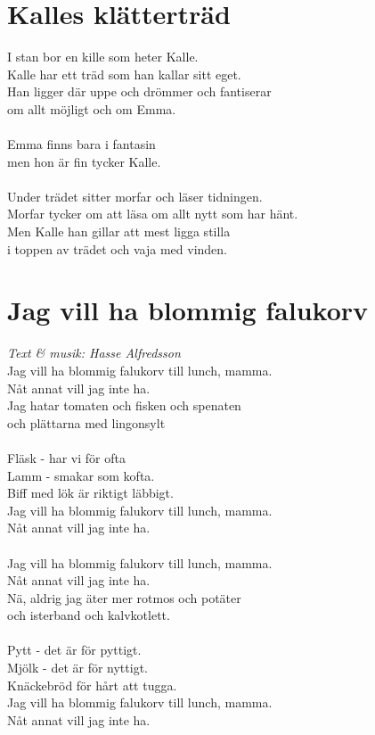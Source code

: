 \section{Kalles klätterträd}
I stan bor en kille som heter Kalle.\\
Kalle har ett träd som han kallar sitt eget.\\
Han ligger där uppe och drömmer och fantiserar\\
om allt möjligt och om Emma.\\
\\
Emma finns bara i fantasin \\
men hon är fin tycker Kalle.\\
\\
Under trädet sitter morfar och läser tidningen.\\
Morfar tycker om att läsa om allt nytt som har hänt.\\
Men Kalle han gillar att mest ligga stilla\\
i toppen av trädet och vaja med vinden.\\

\section{Jag vill ha blommig falukorv}
\textit{Text \& musik: Hasse Alfredsson}
\vspace{2mm}\\
Jag vill ha blommig falukorv till lunch, mamma.\\
Nåt annat vill jag inte ha.\\
Jag hatar tomaten och fisken och spenaten\\
och plättarna med lingonsylt\\
\\
Fläsk - har vi för ofta\\
Lamm - smakar som kofta.\\
Biff med lök är riktigt läbbigt.\\
Jag vill ha blommig falukorv till lunch, mamma.\\
Nåt annat vill jag inte ha.\\
\\
Jag vill ha blommig falukorv till lunch, mamma.\\
Nåt annat vill jag inte ha.\\
Nä, aldrig jag äter mer rotmos och potäter\\
och isterband och kalvkotlett.\\
\\
Pytt - det är för pyttigt.\\
Mjölk - det är för nyttigt.\\
Knäckebröd för hårt att tugga.\\
Jag vill ha blommig falukorv till lunch, mamma.\\
Nåt annat vill jag inte ha.\\

